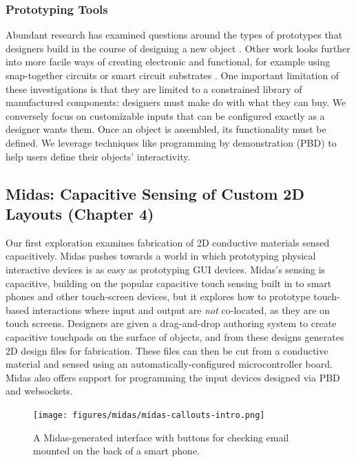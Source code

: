 \subsubsection{Prototyping Tools}
Abundant research has examined questions around the types of prototypes that designers build in the course of designing a new object \cite{houde-prototypes}. Other work looks further into more facile ways of creating electronic and functional, for example using snap-together circuits \cite{littleBits, hartmann-dtools, villar-gadgeteer} or smart circuit substrates \cite{villar-voodooio}. One important limitation of these investigations is that they are limited to a constrained library of manufactured components: designers must make do with what they can buy. We conversely focus on customizable inputs that can be configured exactly as a designer wants them. Once an object is assembled, its functionality must be defined. We leverage techniques like programming by demonstration (PBD) \cite{myers-pbd, hartmann-dtools} to help users define their objects' interactivity.


\subsection{Midas: Capacitive Sensing of Custom 2D Layouts (Chapter 4)}

Our first exploration examines fabrication of 2D conductive materials sensed capacitively. Midas pushes towards a world in which prototyping physical interactive devices is as easy as prototyping GUI devices. Midas's sensing is capacitive, building on the popular capacitive touch sensing built in to smart phones and other touch-screen devices, but it explores how to prototype touch-based interactions where input and output are \emph{not} co-located, as they are on touch screens. Designers are given a drag-and-drop authoring system to create capacitive touchpads on the surface of objects, and from these designs generates 2D design files for fabrication. These files can then be cut from a conductive material and sensed using an automatically-configured microcontroller board. Midas also offers support for programming the input devices designed via PBD and websockets.

\begin{figure}
\centering
\texttt{[image: figures/midas/midas-callouts-intro.png]}
\caption{A Midas-generated interface with buttons for checking email mounted on the back of a smart phone.}
\label{fig:midas-intro}
\end{figure}

